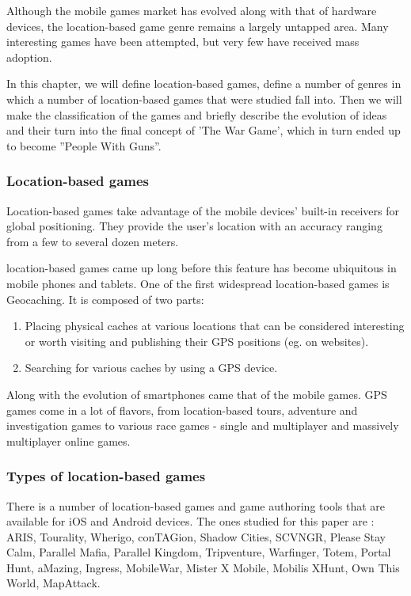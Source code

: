 Although the mobile games market has evolved along with that of hardware
devices, the location-based game genre remains a largely untapped area. Many
interesting games have been attempted, but very few have received mass
adoption.\newline

In this chapter, we will define location-based games, define a number of
genres in which a number of location-based games that were studied fall
into. Then we will make the classification of the games and briefly describe the
evolution of ideas and their turn into the final concept of 'The War Game',
which in turn ended up to become ''People With Guns''.


\subsubsection{Location-based games}
Location-based games take advantage of the mobile devices' built-in receivers
for global positioning. They provide the user's location with an accuracy
ranging from a few to several dozen meters. \newline

location-based games came up long before this feature has become ubiquitous in mobile
phones and tablets. One of the first widespread location-based games is Geocaching.
It is composed of two parts:

\begin{enumerate}
  \item Placing physical caches at various locations that can be considered
  interesting or worth visiting and publishing their GPS positions (eg. on
  websites).
  \item Searching for various caches by using a GPS device.
\end{enumerate}

Along with the evolution of smartphones came that of the mobile games. GPS games
come in a lot of flavors, from location-based tours, adventure and investigation
games to various race games - single and multiplayer and massively multiplayer
online games.


\subsubsection{Types of location-based games}

There is a number of location-based games and game authoring tools that are
available for iOS and Android devices. The ones studied for this paper are :
ARIS, Tourality, Wherigo, conTAGion, Shadow Cities, SCVNGR, Please Stay Calm,
Parallel Mafia, Parallel Kingdom, Tripventure, Warfinger, Totem, Portal Hunt,
aMazing, Ingress, MobileWar, Mister X Mobile, Mobilis XHunt, Own This World,
MapAttack.\newline

